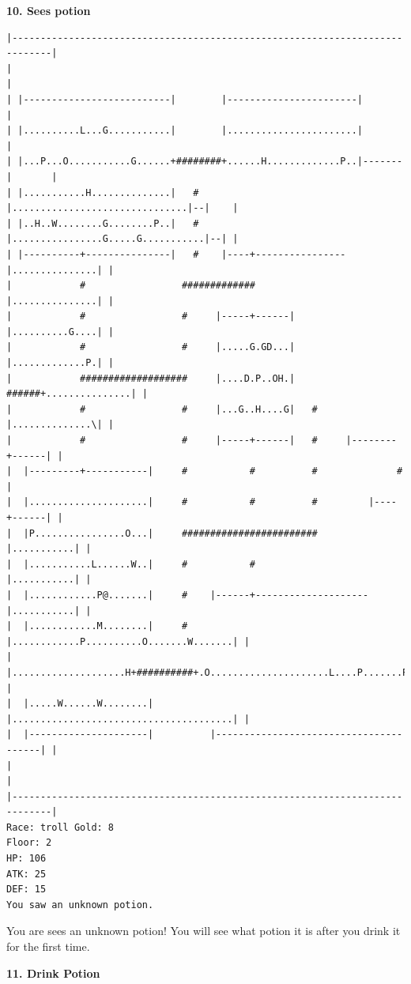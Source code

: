 \documentclass[11pt]{article}
\theoremstyle{plain}
\begin{document}
\newpage
\textbf{10. Sees potion}
\begin{Verbatim}[fontsize=\scriptsize]
|-----------------------------------------------------------------------------|
|                                                                             |
| |--------------------------|        |-----------------------|               |
| |..........L...G...........|        |.......................|               |
| |...P...O...........G......+########+......H.............P..|-------|       |
| |...........H..............|   #    |...............................|--|    |
| |..H..W........G........P..|   #    |................G.....G...........|--| |
| |----------+---------------|   #    |----+----------------|...............| |
|            #                 #############                |...............| |
|            #                 #     |-----+------|         |..........G....| |
|            #                 #     |.....G.GD...|         |.............P.| |
|            ###################     |....D.P..OH.|   ######+...............| |
|            #                 #     |...G..H....G|   #     |..............\| |
|            #                 #     |-----+------|   #     |--------+------| |
|  |---------+-----------|     #           #          #              #        |
|  |.....................|     #           #          #         |----+------| |
|  |P................O...|     ########################         |...........| |
|  |...........L......W..|     #           #                    |...........| |
|  |............P@.......|     #    |------+--------------------|...........| |
|  |............M........|     #    |............P..........O.......W.......| |
|  |....................H+##########+.O.....................L....P.......P..| |
|  |.....W......W........|          |.......................................| |
|  |---------------------|          |---------------------------------------| |
|                                                                             |
|-----------------------------------------------------------------------------|
Race: troll Gold: 8                                                    Floor: 2
HP: 106
ATK: 25
DEF: 15
You saw an unknown potion. 
\end{Verbatim}

You are sees an unknown potion! You will see what potion it is after you
drink it for the first time.





\newpage
\textbf{11. Drink Potion}
\end{document}
